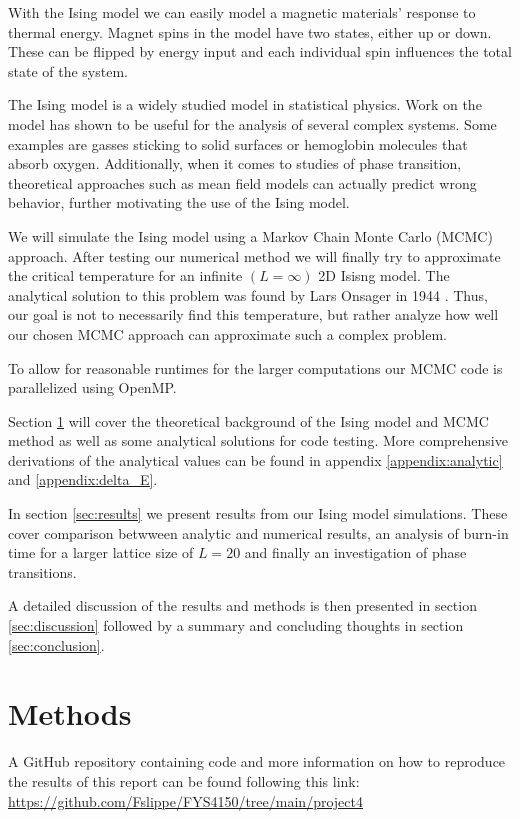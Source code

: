\documentclass[english,notitlepage,reprint,nofootinbib]{revtex4-1}  %
\begin{document}
With the Ising model we can easily model a magnetic materials' response to thermal energy. Magnet spins in the model have two states, either up or down. These can be flipped by energy input and each individual spin influences the total state of the system.

The Ising model is a widely studied model in statistical physics. Work on the model has shown to be useful for the analysis of several complex systems. Some examples are gasses sticking to solid surfaces or hemoglobin molecules that absorb oxygen. Additionally, when it comes to studies of phase transition, theoretical approaches such as mean field models can actually predict wrong behavior, further motivating the use of the Ising model.\cite{compendium}

We will simulate the Ising model using a Markov Chain Monte Carlo (MCMC) approach. After testing our numerical method we will finally try to approximate the critical temperature for an infinite $(L=\infty)$ 2D Isisng model. The analytical solution to this problem was found by Lars Onsager in 1944 \cite{project}. Thus, our goal is not to necessarily find this temperature, but rather analyze how well our chosen MCMC approach can approximate such a complex problem.

To allow for reasonable runtimes for the larger computations our MCMC code is parallelized using OpenMP.

Section \ref{sec:methods} will cover the theoretical background of the Ising model and MCMC method as well as some analytical solutions for code testing. More comprehensive derivations of the analytical values can be found in appendix \ref{appendix:analytic} and \ref{appendix:delta_E}.

In section \ref{sec:results} we present results from our Ising model simulations. These cover comparison betwween analytic and numerical results, an analysis of burn-in time for a larger lattice size of $L = 20$ and finally an investigation of phase transitions.

A detailed discussion of the results and methods is then presented in section \ref{sec:discussion} followed by a summary and concluding thoughts in section \ref{sec:conclusion}.

\section{Methods}\label{sec:methods}
A GitHub repository containing code and more information on how to reproduce the results of this report can be found following this link:
\url{https://github.com/Fslippe/FYS4150/tree/main/project4}
\end{document}
